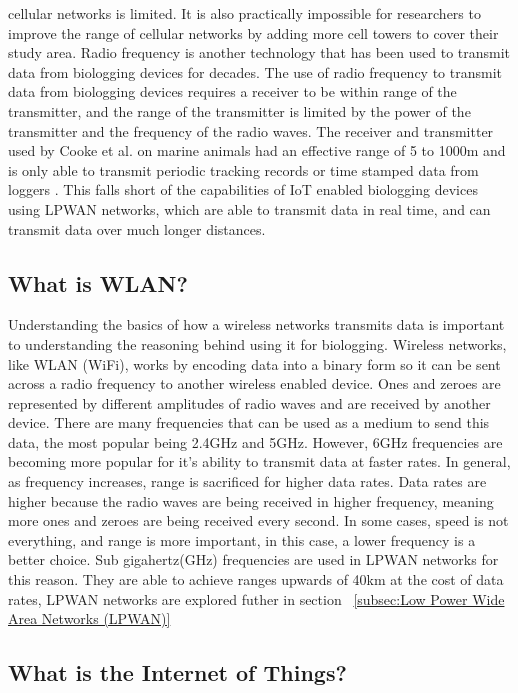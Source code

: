 \documentclass[sigplan,screen,nonacm]{acmart}
\begin{document}
cellular networks is limited. It is also practically impossible for researchers
to improve the range of cellular networks by adding more cell towers to cover
their study area. Radio frequency is another technology that has been used to
transmit data from biologging devices for decades. The use of radio frequency
to transmit data from biologging devices requires a receiver to be within range
of the transmitter, and the range of the transmitter is limited by the power of
the transmitter and the frequency of the radio waves. The receiver and transmitter
used by Cooke et al. on marine animals had an effective range of 5 to 1000m and 
is only able to transmit periodic tracking records or time stamped data from loggers
\cite{cooke2012biotelemetry}. This falls short of the capabilities of IoT enabled 
biologging devices using LPWAN networks, which are able to transmit data in real time, and can transmit 
data over much longer distances. 

\subsection{What is WLAN?}
\label{subsec:What is WLAN?}

Understanding the basics of how a wireless networks transmits data is important to understanding 
the reasoning behind using it for biologging. Wireless networks, like WLAN (WiFi), 
works by encoding data into a binary form so it can be sent across a radio frequency to another 
wireless enabled device. Ones and zeroes are represented by different amplitudes of radio waves 
and are received by another device\cite{Ghimire_2023}. There are many frequencies that can 
be used as a medium to send this data, the most popular being 2.4GHz and 5GHz. However, 6GHz 
frequencies are becoming more popular for it's ability to transmit data at faster rates. In general, 
as frequency increases, range is sacrificed for higher data rates\cite{Netgear}. Data rates are 
higher because the radio waves are being received in higher 
frequency, meaning more ones and zeroes are being received every second. In 
some cases, speed is not everything, and range is more important, in this case, a lower frequency 
is a better choice. Sub gigahertz(GHz) frequencies are used in LPWAN networks for this reason. They 
are able to achieve ranges upwards of 40km at the cost of data rates, LPWAN networks are explored futher 
in section ~\ref{subsec:Low Power Wide Area Networks (LPWAN)}

\subsection{What is the Internet of Things?}
\label{subsec:What is the Internet of Things}
\end{document}
